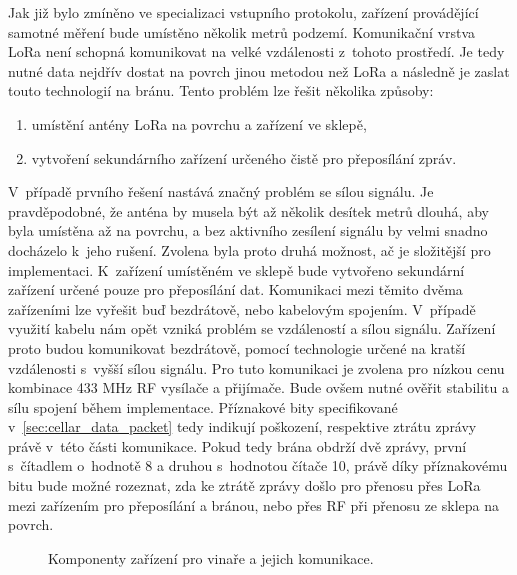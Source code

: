 Jak již bylo zmíněno ve specializaci vstupního protokolu, zařízení provádějící samotné měření bude umístěno několik metrů podzemí. Komunikační vrstva LoRa není schopná komunikovat na velké vzdálenosti z~tohoto prostředí. Je tedy nutné data nejdřív dostat na povrch jinou metodou než LoRa a následně je zaslat touto technologií na bránu. Tento problém lze řešit několika způsoby:
\begin{enumerate}
    \item umístění antény LoRa na povrchu a zařízení ve sklepě,
    \item vytvoření sekundárního zařízení určeného čistě pro přeposílání zpráv.
\end{enumerate}
V~případě prvního řešení nastává značný problém se sílou signálu. Je pravděpodobné, že anténa by musela být až několik desítek metrů dlouhá, aby byla umístěna až na povrchu, a bez aktivního zesílení signálu by velmi snadno docházelo k~jeho rušení. Zvolena byla proto druhá možnost, ač je složitější pro implementaci. K~zařízení umístěném ve sklepě bude vytvořeno sekundární zařízení určené pouze pro přeposílání dat. Komunikaci mezi těmito dvěma zařízeními lze vyřešit buď bezdrátově, nebo kabelovým spojením. V~případě využití kabelu nám opět vzniká problém se vzdáleností a sílou signálu. Zařízení proto budou komunikovat bezdrátově, pomocí technologie určené na kratší vzdálenosti s~vyšší sílou signálu. Pro tuto komunikaci je zvolena pro nízkou cenu kombinace 433 MHz RF vysílače a přijímače. Bude ovšem nutné ověřit stabilitu a sílu spojení během implementace. Příznakové bity specifikované v~\ref{sec:cellar_data_packet} tedy indikují poškození, respektive ztrátu zprávy právě v~této části komunikace. Pokud tedy brána obdrží dvě zprávy, první s~čítadlem o~hodnotě 8 a druhou s~hodnotou čítače 10, právě díky příznakovému bitu bude možné rozeznat, zda ke ztrátě zprávy došlo pro přenosu přes LoRa mezi zařízením pro přeposílání a bránou, nebo přes RF při přenosu ze sklepa na povrch.

\begin{figure}[h]
  \centering
  
  \caption{Komponenty zařízení pro vinaře a jejich komunikace.}
  \label{dia:cellar_components}
\end{figure}

